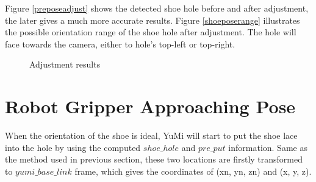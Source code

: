 Figure \ref{preposeadjust} shows the detected shoe hole before and after adjustment, the later gives a much more accurate results. Figure \ref{shoeposerange} illustrates the possible orientation range of the shoe hole after adjustment. The hole will face towards the camera, either to hole's top-left or top-right.

\begin{figure}[H]
\centering
{}
\caption{Adjustment results}
\end{figure}


\section{Robot Gripper Approaching Pose}
When the orientation of the shoe is ideal, YuMi will start to put the shoe lace into the hole by using the computed $shoe\_hole$ and $pre\_put$ information. Same as the method used in previous section, these two locations are firstly transformed to $yumi\_base\_link$ frame, which gives the coordinates of (xn, yn, zn) and (x, y, z).


